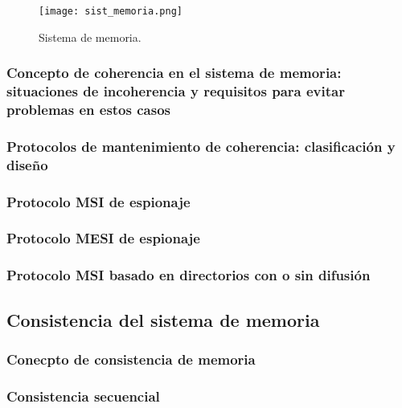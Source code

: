 \documentclass[12pt,spanish]{article}
\begin{document}
\begin{figure}[H]
\centering
\texttt{[image: sist\_memoria.png]}
\caption{Sistema de memoria.}
\end{figure}

\subsubsection{Concepto de coherencia en el sistema de memoria:  situaciones de incoherencia y requisitos para evitar problemas en estos casos}



\subsubsection{Protocolos de mantenimiento de coherencia: clasificación y diseño}



\subsubsection{Protocolo MSI de espionaje}




\subsubsection{Protocolo MESI de espionaje}




\subsubsection{Protocolo MSI basado en directorios con o sin difusión}






\subsection{Consistencia del sistema de memoria}

\subsubsection{Conecpto de consistencia de memoria}





\subsubsection{Consistencia secuencial}
\end{document}
